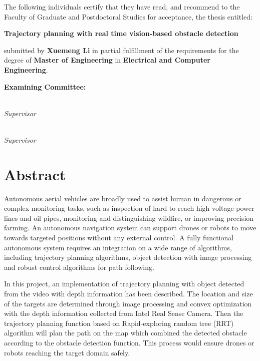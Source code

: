 
\noindent The following individuals certify that they have read,
and recommend to the Faculty of Graduate and Postdoctoral Studies
for acceptance, the thesis entitled:

\begin{center}
{\large \textbf{Trajectory planning with real time vision-based obstacle detection}}
\end{center}

submitted by \textbf{Xuemeng Li} in partial fulfillment of the requirements for the degree of \textbf{Master of Engineering} in \textbf{Electrical and Computer Engineering}.%
\par\bigskip%

\noindent\textbf{Examining Committee:}%
\par\medskip{}\\\emph{Supervisor}
\par\medskip{}\\\emph{Supervisor}
\cleardoublepage

\chapter{Abstract}

Autonomous aerial vehicles are broadly used to assist human in dangerous or complex monitoring tasks, such as inspection of hard to reach high voltage power lines and oil pipes, monitoring and distinguishing wildfire, or improving precision farming. An autonomous navigation system can support drones or robots to move towards targeted positions without any external control. A fully functional autonomous system requires an integration on a wide range of algorithms, including trajectory planning algorithms, object detection with image processing and robust control algorithms for path following. 

In this project, an implementation of trajectory planning with object detected from the video with depth information has been described. The location and size of the targets are determined through image processing and convex optimization with the depth information collected from Intel Real Sense Camera. Then the trajectory planning function based on Rapid-exploring random tree (RRT) algorithm will plan the path on the map which combined the detected obstacle according to the obstacle detection function. This process would ensure drones or robots reaching the target domain safely.



